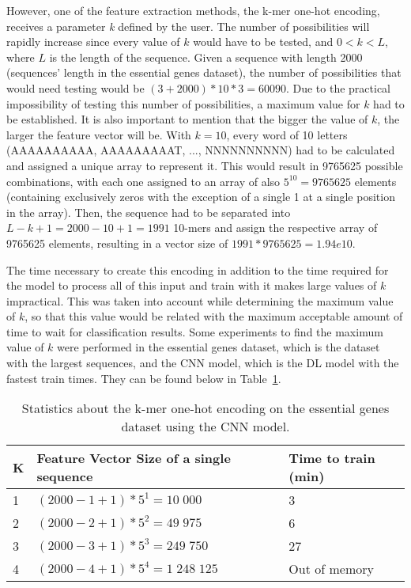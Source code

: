 However, one of the feature extraction methods, the k-mer one-hot encoding, receives a parameter \textit{k} defined by the user. The number of possibilities will rapidly increase since every value of $k$ would have to be tested, and $0 < k < L$, where $L$ is the length of the sequence. Given a sequence with length 2000 (sequences' length in the essential genes dataset), the number of possibilities that would need testing would be $(3+2000) * 10 * 3 = 60090$. Due to the practical impossibility of testing this number of possibilities, a maximum value for $k$ had to be established. It is also important to mention that the bigger the value of $k$, the larger the feature vector will be. With $k = 10$, every word of 10 letters (AAAAAAAAAA, AAAAAAAAAT, ..., NNNNNNNNNN) had to be calculated and assigned a unique array to represent it. This would result in 9765625 possible combinations, with each one assigned to an array of also $5^{10} = 9765625$ elements (containing exclusively zeros with the exception of a single 1 at a single position in the array). Then, the sequence had to be separated into $L-k+1 = 2000 - 10 + 1 = 1991$ 10-mers and assign the respective array of 9765625 elements, resulting in a vector size of $1991 * 9765625 = 1.94e10$.

The time necessary to create this encoding in addition to the time required for the model to process all of this input and train with it makes large values of $k$ impractical. This was taken into account while determining the maximum value of $k$, so that this value would be related with the maximum acceptable amount of time to wait for classification results. Some experiments to find the maximum value of $k$ were performed in the essential genes dataset, which is the dataset with the largest sequences, and the \gls{CNN} model, which is the \gls{DL} model with the fastest train times. They can be found below in Table~\ref{tab:stats_kmer}.

\begin{table}[ht]
	\caption{Statistics about the k-mer one-hot encoding on the essential genes dataset using the CNN model.}
	\label{tab:stats_kmer}
    \centering
    \begin{tabular}{lll}
    	\toprule
    	\textbf{K} & \textbf{Feature Vector Size of a single sequence} & \textbf{Time to train (min)}\\\midrule
    	
    	1 & $(2000 - 1 + 1) * 5^{1} = 10\;000$ & 3 \\\midrule
        2 & $(2000 - 2 + 1) * 5^{2} = 49\;975$ & 6\\\midrule
        3 & $(2000 - 3 + 1) * 5^{3} = 249\;750$ & 27\\\midrule
        4 & $(2000 - 4 + 1) * 5^{4} = 1\;248\;125$ & Out of memory\\
        
    	\bottomrule
    \end{tabular}
\end{table}

